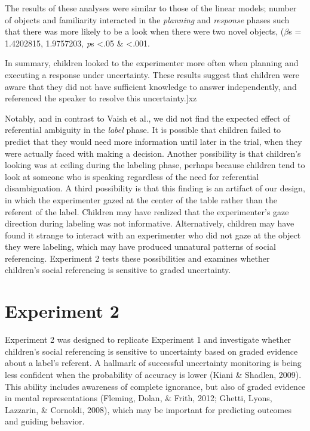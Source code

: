 \documentclass[a4paper,man,apacite,floatsintext]{apa6}
\begin{document}
The results of these analyses were similar to those of the linear
models; number of objects and familiarity interacted in the
\emph{planning} and \emph{response} phases such that there was more
likely to be a look when there were two novel objects, (\(\beta\)s =
1.4202815, 1.9757203, \emph{p}s \textless{}.05 \& \textless{}.001.

In summary, children looked to the experimenter more often when planning
and executing a response under uncertainty. These results suggest that
children were aware that they did not have sufficient knowledge to
answer independently, and referenced the speaker to resolve this
uncertainty.{]}xz

Notably, and in contrast to Vaish et al., we did not find the expected
effect of referential ambiguity in the \emph{label} phase. It is
possible that children failed to predict that they would need more
information until later in the trial, when they were actually faced with
making a decision. Another possibility is that children's looking was at
ceiling during the labeling phase, perhaps because children tend to look
at someone who is speaking regardless of the need for referential
disambiguation. A third possibility is that this finding is an artifact
of our design, in which the experimenter gazed at the center of the
table rather than the referent of the label. Children may have realized
that the experimenter's gaze direction during labeling was not
informative. Alternatively, children may have found it strange to
interact with an experimenter who did not gaze at the object they were
labeling, which may have produced unnatural patterns of social
referencing. Experiment 2 tests these possibilities and examines whether
children's social referencing is sensitive to graded uncertainty.

\section{Experiment 2}\label{experiment-2}

Experiment 2 was designed to replicate Experiment 1 and investigate
whether children's social referencing is sensitive to uncertainty based
on graded evidence about a label's referent. A hallmark of successful
uncertainty monitoring is being less confident when the probability of
accuracy is lower (Kiani \& Shadlen, 2009). This ability includes
awareness of complete ignorance, but also of graded evidence in mental
representations (Fleming, Dolan, \& Frith, 2012; Ghetti, Lyons,
Lazzarin, \& Cornoldi, 2008), which may be important for predicting
outcomes and guiding behavior.
\end{document}
